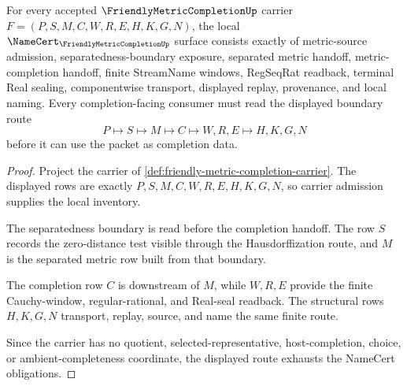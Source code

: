 \begin{theorem}
\label{thm:friendly-metric-completion-namecert-obligations}
For every accepted $\FriendlyMetricCompletionUp$ carrier $F=(P,S,M,C,W,R,E,H,K,G,N)$, the local $\NameCert_{\FriendlyMetricCompletionUp}$ surface consists exactly of metric-source admission, separatedness-boundary exposure, separated metric handoff, metric-completion handoff, finite StreamName windows, RegSeqRat readback, terminal Real sealing, componentwise transport, displayed replay, provenance, and local naming. Every completion-facing consumer must read the displayed boundary route
$$
P \longmapsto S \longmapsto M \longmapsto C \longmapsto W,R,E \longmapsto H,K,G,N
$$
before it can use the packet as completion data.
\end{theorem}
\begin{proof}
Project the carrier of \autoref{def:friendly-metric-completion-carrier}. The displayed rows are exactly $P,S,M,C,W,R,E,H,K,G,N$, so carrier admission supplies the local inventory.

The separatedness boundary is read before the completion handoff. The row $S$ records the zero-distance test visible through the Hausdorffization route, and $M$ is the separated metric row built from that boundary.

The completion row $C$ is downstream of $M$, while $W,R,E$ provide the finite Cauchy-window, regular-rational, and Real-seal readback. The structural rows $H,K,G,N$ transport, replay, source, and name the same finite route.

Since the carrier has no quotient, selected-representative, host-completion, choice, or ambient-completeness coordinate, the displayed route exhausts the NameCert obligations.
\end{proof}

